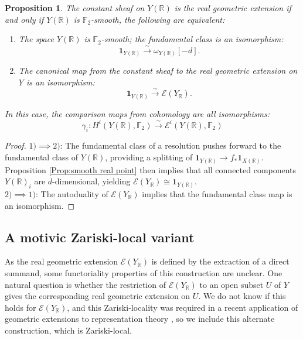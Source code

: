 \documentclass{amsart}
\newtheorem{prop}[thm]{Proposition}
\theoremstyle{definition}
\theoremstyle{remark}
\begin{document}
\begin{prop}
The constant sheaf on $Y(\mathbb{R})$ is the real geometric extension if and only if $Y(\mathbb{R})$ is $\mathbb{F}_2$-smooth, the following are equivalent:
\begin{enumerate}
    
    \item The space $Y(\mathbb{R})$ is $\mathbb{F}_2$-smooth; the fundamental class is an isomorphism: \[\mathbf{1}_{Y(\mathbb{R})}\xrightarrow{\sim} \omega_{Y(\mathbb{R})}[-d].\]
    \item The canonical map from the constant sheaf to the real geometric extension on $Y$ is an isomorphism: \[\mathbf{1}_{Y(\mathbb{R})}\xrightarrow{\sim} \mathscr{E}(Y_\mathbb{R}).\]
    
    
\end{enumerate}
In this case, the comparison maps from cohomology are all isomorphisms:\[\gamma_i:H^i(Y(\mathbb{R}),\mathbb{F}_2)\xrightarrow{\sim} \mathscr{E}^i(Y(\mathbb{R}),\mathbb{F}_2)\]
\end{prop}

\begin{proof}
$1)\implies 2)$: The fundamental class of a resolution pushes forward to the fundamental class of $Y(\mathbb{R})$, providing a splitting of $\mathbf{1}_{Y(\mathbb{R})}\to f_*\mathbf{1}_{X(\mathbb{R})}$. Proposition \ref{Prop:smooth real point} then implies that all connected components $Y(\mathbb{R})_i$ are $d$-dimensional, yielding $\mathscr{E}(Y_\mathbb{R})\cong \mathbf{1}_{Y(\mathbb{R})}$.\\
$2)\implies 1)$: The autoduality of $\mathscr{E}(Y_\mathbb{R})$ implies that the fundamental class map is an isomorphism.
\end{proof}

\subsection{A motivic Zariski-local variant}

As the real geometric extension $\mathscr{E}(Y_\mathbb{R})$ is defined by the extraction of a direct summand, some functoriality properties of this construction are unclear. One natural question is whether the restriction of $\mathscr{E}(Y_\mathbb{R})$ to an open subset $U$ of $Y$ gives the corresponding real geometric extension on $U$. We do not know if this holds for $\mathscr{E}(Y_\mathbb{R})$, and this Zariski-locality was required in a recent application of geometric extensions to representation theory \cite{baine2026geometrytiltingcompositionseries}, so we include this alternate construction, which is Zariski-local.
\end{document}
